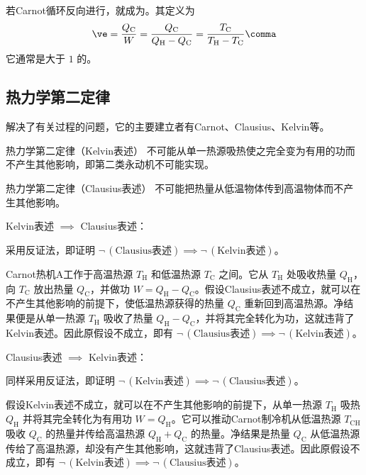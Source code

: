     若Carnot循环反向进行，就成为。其定义为
    \begin{equation}
      \ve = \frac{Q_\text{C}}{W}
      = \frac{Q_\text{C}}{Q_\text{H} - Q_\text{C}}
      = \frac{T_\text{C}}{T_\text{H} - T_\text{C}} \comma
    \end{equation}
    它通常是大于 $1$ 的。
    
  \subsection{热力学第二定律}
    解决了有关过程的问题，它的主要建立者有Carnot、Clausius、Kelvin等。
    
    \begin{myThm}{热力学第二定律（Kelvin表述）}
      不可能从单一热源吸热使之完全变为有用的功而不产生其他影响，即第二类永动机不可能实现。
    \end{myThm}
    \begin{myThm}{热力学第二定律（Clausius表述）}
      不可能把热量从低温物体传到高温物体而不产生其他影响。
    \end{myThm}
    
    \begin{myProof}%
      Kelvin表述 $\implies$ Clausius表述：
      
      采用反证法，即证明 $\neg \, (\text{Clausius表述}) \implies \neg \, (\text{Kelvin表述})$。
      
      Carnot热机A工作于高温热源 $T_\text{H}$ 和低温热源 $T_\text{C}$ 之间。它从 $T_\text{H}$ 处吸收热量 $Q_\text{H}$，向 $T_\text{C}$ 放出热量 $Q_\text{C}$，并做功 $W = Q_\text{H} - Q_\text{C}$。假设Clausius表述不成立，就可以在不产生其他影响的前提下，使低温热源获得的热量 $Q_\text{C}$ 重新回到高温热源。净结果便是从单一热源 $T_\text{H}$ 吸收了热量 $Q_\text{H} - Q_\text{C}$，并将其完全转化为功，这就违背了Kelvin表述。因此原假设不成立，即有 $\neg \, (\text{Clausius表述}) \implies \neg \, (\text{Kelvin表述})$。
      
      \blankline
      
      Clausius表述 $\implies$ Kelvin表述：
      
      同样采用反证法，即证明 $\neg \, (\text{Kelvin表述}) \implies \neg \, (\text{Clausius表述})$。
      
      假设Kelvin表述不成立，就可以在不产生其他影响的前提下，从单一热源 $T_\text{H}$ 吸热 $Q_\text{H}$ 并将其完全转化为有用功 $W = Q_\text{H}$。它可以推动Carnot制冷机从低温热源 $T_\text{CH}$ 吸收 $Q_\text{C}$ 的热量并传给高温热源 $Q_\text{H} + Q_\text{C}$ 的热量。净结果是热量 $Q_\text{C}$ 从低温热源传给了高温热源，却没有产生其他影响，这就违背了Clausius表述。因此原假设不成立，即有 $\neg \, (\text{Kelvin表述}) \implies \neg \, (\text{Clausius表述})$。
    \end{myProof}
    
